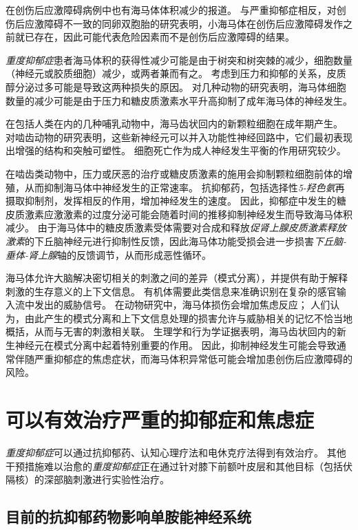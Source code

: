 在创伤后应激障碍病例中也有海马体体积减少的报道。
与严重抑郁症相反，对创伤后应激障碍不一致的同卵双胞胎的研究表明，小海马体在创伤后应激障碍发作之前就已存在，因此可能代表危险因素而不是创伤后应激障碍的结果。


\textit{重度抑郁症}患者海马体积的获得性减少可能是由于树突和树突棘的减少，细胞数量（神经元或胶质细胞）减少，或两者兼而有之。
考虑到压力和抑郁的关系，皮质醇分泌过多可能是导致这两种损失的原因。
对几种动物的研究表明，海马体细胞数量的减少可能是由于压力和糖皮质激素水平升高抑制了成年海马体的神经发生。


在包括人类在内的几种哺乳动物中，海马齿状回内的新颗粒细胞在成年期产生。
对啮齿动物的研究表明，这些新神经元可以并入功能性神经回路中，它们最初表现出增强的结构和突触可塑性。
细胞死亡作为成人神经发生平衡的作用研究较少。


在啮齿类动物中，压力或厌恶的治疗或糖皮质激素的施用会抑制颗粒细胞前体的增殖，从而抑制海马体中神经发生的正常速率。
抗抑郁药，包括选择性\textit{5-羟色氨}再摄取抑制剂，发挥相反的作用，增加神经发生的速度。
因此，抑郁症中发生的糖皮质激素应激激素的过度分泌可能会随着时间的推移抑制神经发生而导致海马体积减少。
由于海马体中的糖皮质激素受体需要对合成和释放\textit{促肾上腺皮质激素释放激素}的下丘脑神经元进行抑制性反馈，因此海马体功能受损会进一步损害\textit{下丘脑-垂体-肾上腺}轴的反馈调节，从而形成恶性循环。


海马体允许大脑解决密切相关的刺激之间的差异（模式分离），并提供有助于解释刺激的生存意义的上下文信息。
有机体需要此类信息来准确识别在复杂的感官输入流中发出的威胁信号。
在动物研究中，海马体损伤会增加焦虑反应；
人们认为，由此产生的模式分离和上下文信息处理的损害允许与威胁相关的记忆不恰当地概括，从而与无害的刺激相关联。
生理学和行为学证据表明，海马齿状回内的新生神经元在模式分离中起着特别重要的作用。
因此，抑制神经发生可能会导致通常伴随严重抑郁症的焦虑症状，而海马体积异常低可能会增加患创伤后应激障碍的风险。



\section{可以有效治疗严重的抑郁症和焦虑症}

\textit{重度抑郁症}可以通过抗抑郁药、认知心理疗法和电休克疗法得到有效治疗。
其他干预措施难以治愈的\textit{重度抑郁症}正在通过针对膝下前额叶皮层和其他目标（包括伏隔核）的深部脑刺激进行实验性治疗。



\subsection{目前的抗抑郁药物影响单胺能神经系统}

